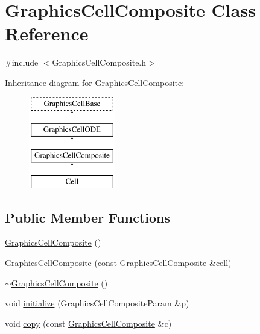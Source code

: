 \hypertarget{class_graphics_cell_composite}{\section{\-Graphics\-Cell\-Composite \-Class \-Reference}
\label{class_graphics_cell_composite}
}


{\ttfamily \#include $<$\-Graphics\-Cell\-Composite.\-h$>$}

\-Inheritance diagram for \-Graphics\-Cell\-Composite\-:\begin{figure}[H]
\begin{center}
\leavevmode
\includegraphics[height=4.000000cm]{class_graphics_cell_composite}
\end{center}
\end{figure}
\subsection*{\-Public \-Member \-Functions}
\begin{DoxyCompactItemize}
\item 
\hyperlink{class_graphics_cell_composite_a1c7ae93e329171a19a2a62b9220e1271}{\-Graphics\-Cell\-Composite} ()
\item 
\hyperlink{class_graphics_cell_composite_aabf09e89c4cc34389b15e70fd5d58db9}{\-Graphics\-Cell\-Composite} (const \hyperlink{class_graphics_cell_composite}{\-Graphics\-Cell\-Composite} \&cell)
\item 
\hyperlink{class_graphics_cell_composite_ae8f7c306f42815bba3e39b31c7fc8304}{$\sim$\-Graphics\-Cell\-Composite} ()
\item 
void \hyperlink{class_graphics_cell_composite_a062976e792a793aeb051d6fe0e951e06}{initialize} (\-Graphics\-Cell\-Composite\-Param \&p)
\item 
void \hyperlink{class_graphics_cell_composite_acc56ee3392352a6bd0d2ea943ceed031}{copy} (const \hyperlink{class_graphics_cell_composite}{\-Graphics\-Cell\-Composite} \&c)
\end{DoxyCompactItemize}
